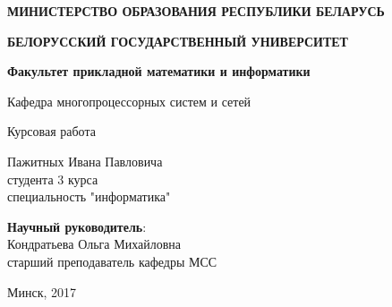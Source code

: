 \begin{titlepage}
    \begin{center}
         \textbf{МИНИСТЕРСТВО ОБРАЗОВАНИЯ РЕСПУБЛИКИ БЕЛАРУСЬ}
    \end{center}
    \begin{center}
         \textbf{БЕЛОРУССКИЙ ГОСУДАРСТВЕННЫЙ УНИВЕРСИТЕТ}
    \end{center}
    \begin{center}
         \textbf{Факультет прикладной математики и информатики}
    \end{center}
    \begin{center}
        Кафедра многопроцессорных систем и сетей
    \end{center}
    
    \vspace{9em}
    
    \begin{center}
        \textbf{\@jobtitle}
    \end{center}
    
    \vspace{2em}
    
    \begin{center}
        Курсовая работа
    \end{center}
    
    \vspace{4em}
    
    \begin{flushright}
        Пажитных Ивана Павловича\\
        студента 3 курса\\
        специальность "информатика"\\
    \end{flushright}
    
    \vspace{1em}
    
    \begin{flushright}
         \textbf{Научный руководитель}:\\
        Кондратьева Ольга Михайловна\\
        старший преподаватель кафедры МСС\\
    \end{flushright}
    
    \vfill
    
    \begin{center}
        Минск, 2017
    \end{center}
\end{titlepage}
\newpage

